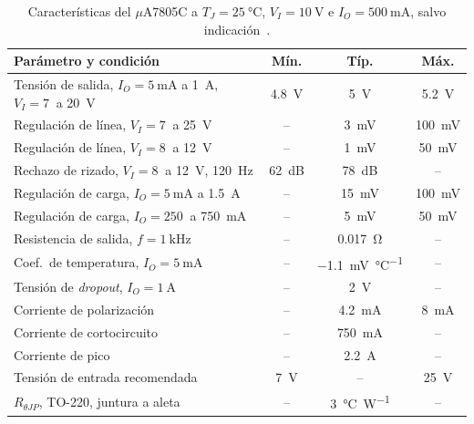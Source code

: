 \begin{table}[!htb]
\centering
\caption{Características del $\mu$A7805C a $T_J = \SI{25}{\celsius}$, $V_I = \SI{10}{\volt}$ e $I_O = \SI{500}{\milli\ampere}$, salvo indicación~\cite{ua78}.}
\label{tab:datasheet_7805}
\footnotesize
\setlength{\tabcolsep}{3.5pt}
\begin{tabular}{@{}>{\raggedright}p{3.9cm}ccc@{}}
\toprule
\textbf{Parámetro y condición} & \textbf{Mín.} & \textbf{Típ.} & \textbf{Máx.} \\
\midrule
Tensión de salida, $I_O = \SI{5}{\milli\ampere}$ a \SI{1}{\ampere}, $V_I = \SI{7}{}$ a \SI{20}{\volt} & \SI{4,8}{\volt} & \SI{5}{\volt} & \SI{5,2}{\volt} \\
Regulación de línea, $V_I = \SI{7}{}$ a \SI{25}{\volt} & -- & \SI{3}{\milli\volt} & \SI{100}{\milli\volt} \\
Regulación de línea, $V_I = \SI{8}{}$ a \SI{12}{\volt} & -- & \SI{1}{\milli\volt} & \SI{50}{\milli\volt} \\
Rechazo de rizado, $V_I = \SI{8}{}$ a \SI{12}{\volt}, \SI{120}{\hertz} & \SI{62}{\deci\bel} & \SI{78}{\deci\bel} & -- \\
Regulación de carga, $I_O = \SI{5}{\milli\ampere}$ a \SI{1,5}{\ampere} & -- & \SI{15}{\milli\volt} & \SI{100}{\milli\volt} \\
Regulación de carga, $I_O = \SI{250}{}$ a \SI{750}{\milli\ampere} & -- & \SI{5}{\milli\volt} & \SI{50}{\milli\volt} \\
Resistencia de salida, $f = \SI{1}{\kilo\hertz}$ & -- & \SI{0,017}{\ohm} & -- \\
Coef.\ de temperatura, $I_O = \SI{5}{\milli\ampere}$ & -- & \SI{-1,1}{\milli\volt\per\celsius} & -- \\
Tensión de \emph{dropout}, $I_O = \SI{1}{\ampere}$ & -- & \SI{2}{\volt} & -- \\
Corriente de polarización & -- & \SI{4,2}{\milli\ampere} & \SI{8}{\milli\ampere} \\
Corriente de cortocircuito & -- & \SI{750}{\milli\ampere} & -- \\
Corriente de pico & -- & \SI{2,2}{\ampere} & -- \\
Tensión de entrada recomendada & \SI{7}{\volt} & -- & \SI{25}{\volt} \\
$R_{\theta JP}$, TO-220, juntura a aleta & -- & \SI{3}{\celsius\per\watt} & -- \\
\bottomrule
\end{tabular}
\end{table}

